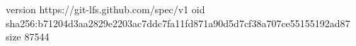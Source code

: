 version https://git-lfs.github.com/spec/v1
oid sha256:b71204d3aa2829e2203ac7ddc7fa11fd871a90d5d7cf38a707ce55155192ad87
size 87544
